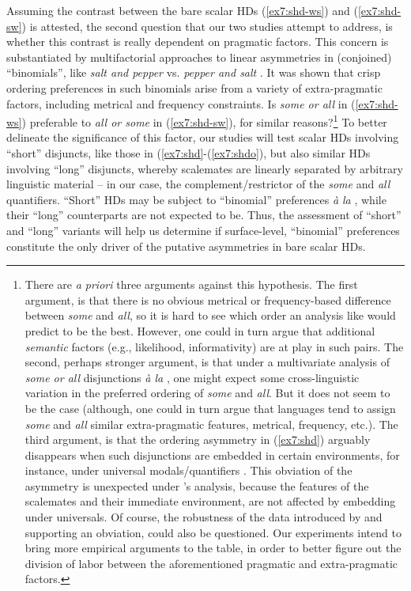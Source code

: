 Assuming the contrast between the bare scalar HDs (\ref{ex7:shd-ws}) and (\ref{ex7:shd-sw}) is attested, the second question that our two studies attempt to address, is whether this contrast is really dependent on pragmatic factors. This concern is substantiated by multifactorial approaches to linear asymmetries in (conjoined) ``binomials'', like \textit{salt and pepper} vs. \textit{pepper and salt} \citep{Benor2006}. It was shown that crisp ordering preferences in such binomials arise from a variety of extra-pragmatic factors, including metrical and frequency constraints. Is \textit{some or all} in (\ref{ex7:shd-ws}) preferable to \textit{all or some} in (\ref{ex7:shd-sw}), for similar reasons?\footnote{There are \textit{a priori} three arguments against this hypothesis. The first argument, is that there is no obvious metrical or frequency-based difference between \textit{some} and \textit{all}, so it is hard to see which order an analysis like \citet{Benor2006} would predict to be the best. However, one could in turn argue that additional \textit{semantic} factors (e.g., likelihood, informativity) are at play in such pairs. The second, perhaps stronger argument, is that under a multivariate analysis of \textit{some or all} disjunctions \textit{à la} \citet{Benor2006}, one might expect some cross-linguistic variation in the preferred ordering of \textit{some} and \textit{all}. But it does not seem to be the case (although, one could in turn argue that languages tend to assign \textit{some} and \textit{all} similar extra-pragmatic features, metrical, frequency, etc.). The third argument, is that the ordering asymmetry in (\ref{ex7:shd}) arguably disappears when such disjunctions are embedded in certain environments, for instance, under universal modals/quantifiers \citep{Fox2018}. This obviation of the asymmetry is unexpected under \citet{Benor2006}'s analysis, because the features of the scalemates and their immediate environment, are not affected by embedding under universals. Of course, the robustness of the data introduced by \citet{Fox2018} and supporting an obviation, could also be questioned. Our experiments intend to bring more empirical arguments to the table, in order to better figure out the division of labor between the aforementioned pragmatic and extra-pragmatic factors.} To better delineate the significance of this factor, our studies will test scalar HDs involving ``short'' disjuncts, like those in (\ref{ex7:shd}-(\ref{ex7:shdo}), but also similar HDs involving ``long'' disjuncts, whereby scalemates are linearly separated by arbitrary linguistic material -- in our case, the complement/restrictor of the \textit{some} and \textit{all} quantifiers. ``Short'' HDs may be subject to ``binomial'' preferences \textit{à la} \citet{Benor2006}, while their ``long'' counterparts are not expected to be. Thus, the assessment of ``short'' and ``long'' variants will help us determine if surface-level, ``binomial'' preferences constitute the only driver of the putative asymmetries in bare scalar HDs.

